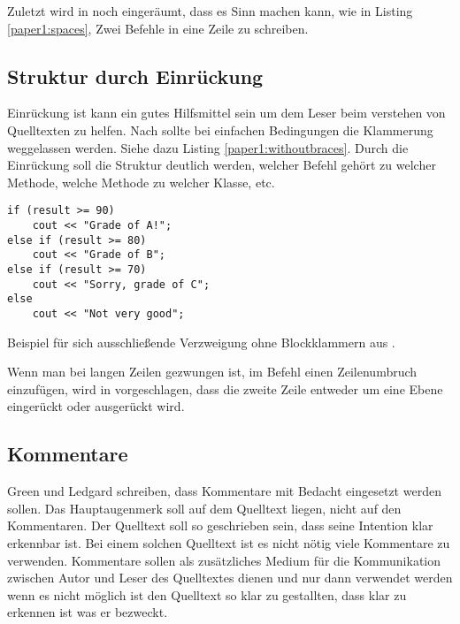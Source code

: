 Zuletzt wird in \cite{Green} noch eingeräumt, dass es Sinn machen kann, wie in Listing \ref{paper1:spaces}, Zwei Befehle in eine Zeile zu schreiben.

\subsection{Struktur durch Einrückung}
Einrückung ist kann ein gutes Hilfsmittel sein um dem Leser beim verstehen von Quelltexten zu helfen. Nach \cite[S. 8]{Green} sollte bei einfachen Bedingungen die Klammerung weggelassen werden. Siehe dazu Listing \ref{paper1:withoutbraces}. Durch die Einrückung soll die Struktur deutlich werden, welcher Befehl gehört zu welcher Methode, welche Methode zu welcher Klasse, etc.

\begin{listing}[H]
    \begin{verbatim}
if (result >= 90)
    cout << "Grade of A!";
else if (result >= 80)
    cout << "Grade of B";
else if (result >= 70)
    cout << "Sorry, grade of C";
else
    cout << "Not very good";
    \end{verbatim}
    \label{paper1:withoutbraces}
    \caption{Beispiel für sich ausschließende Verzweigung ohne Blockklammern aus \cite[S. 8]{Green}.}
\end{listing}

Wenn man bei langen Zeilen gezwungen ist, im Befehl einen Zeilenumbruch einzufügen, wird in \cite[S. 3]{Green} vorgeschlagen, dass die zweite Zeile entweder um eine Ebene eingerückt oder ausgerückt wird.

\subsection{Kommentare}
Green und Ledgard schreiben, dass Kommentare mit Bedacht eingesetzt werden sollen. Das Hauptaugenmerk soll auf dem Quelltext liegen, nicht auf den Kommentaren. Der Quelltext soll so geschrieben sein, dass seine Intention klar erkennbar ist. Bei einem solchen Quelltext ist es nicht nötig viele Kommentare zu verwenden. Kommentare sollen als zusätzliches Medium für die Kommunikation zwischen Autor und Leser des Quelltextes dienen und nur dann verwendet werden wenn es nicht möglich ist den Quelltext so klar zu gestallten, dass klar zu erkennen ist was er bezweckt. \cite[S. 9]{Green}


